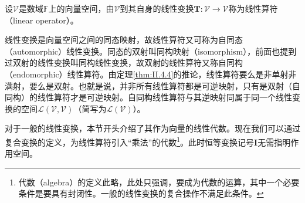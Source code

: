 \documentclass[main.tex]{subfiles}
\begin{document}
\begin{definition}[线性算符]\label{def:II.4.3}
设$\mathcal{V}$是数域$\mathbb{F}$上的向量空间，由$\mathcal{V}$到其自身的线性变换$\mathbf{T}:\mathcal{V}\rightarrow\mathcal{V}$称为线性算符（linear operator）。
\end{definition}

线性变换是向量空间之间的同态映射，故线性算符又可称为自同态（automorphic）线性变换。同态的双射叫同构映射（isomorphism），前面也提到过双射的线性变换叫同构线性变换，故双射的线性算符又称自同构（endomorphic）线性算符。由定理\ref{thm:II.4.4}的推论，线性算符要么是非单射非满射，要么是双射。也就是说，并非所有线性算符都是可逆映射，只有是双射（自同构）的线性算符才是可逆映射。自同构线性算符与其逆映射同属于同一个线性变换的空间$\mathcal{L}\left(\mathcal{V},\mathcal{V}\right)$（简写为$\mathcal{L}\left(\mathcal{V}\right)$）。

对于一般的线性变换，本节开头介绍了其作为向量的线性代数。现在我们可以通过复合变换的定义，为线性算符引入“乘法”的代数\footnote{代数（algebra）的定义此略，此处只强调，要成为代数的运算，其中一个必要条件是要具有封闭性。一般的线性变换的复合操作不满足此条件。}。此时恒等变换记号$\mathbf{I}$无需指明作用空间。
\end{document}
